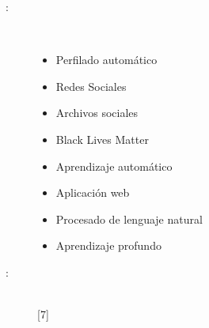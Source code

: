\begin{multicols}{2}
\begin{description}
\item [\palabraschaveprincipal:] \mbox{} \\[-20pt]
\begin{itemize}
    \item Perfilado automático
    \item Redes Sociales
    \item Archivos sociales
    \item Black Lives Matter
    \item Aprendizaje automático
    \item Aplicación web
    \item Procesado de lenguaje natural
    \item Aprendizaje profundo
\end{itemize}
\end{description}
\begin{description}
\item [\palabraschavesecundaria:] \mbox{} \\[-20pt]
  [7] %
\end{description}
\end{multicols}
